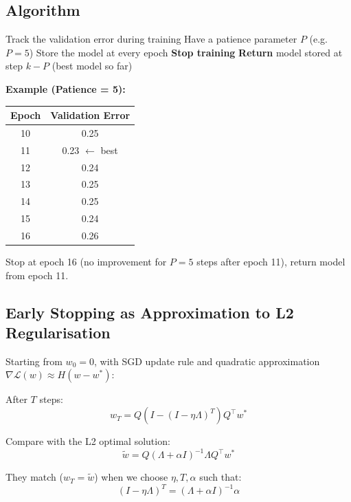 \documentclass[12pt,a4paper]{article}
\newcommand{\Loss}{\mathcal{L}}
\begin{document}
\subsection{Algorithm}

\begin{algorithm}
\caption{Early Stopping}
\begin{algorithmic}[1]
\State Track the validation error during training
\State Have a patience parameter $P$ (e.g.\ $P = 5$)
\State Store the model at every epoch
  \State \textbf{Stop training}
  \State \textbf{Return} model stored at step $k - P$ (best model so far)
\EndIf
\end{algorithmic}
\end{algorithm}

\textbf{Example (Patience = 5):}
\begin{center}
\begin{tabular}{cc}
\toprule
Epoch & Validation Error\\
\midrule
10 & 0.25\\
11 & 0.23 $\leftarrow$ best \\
12 & 0.24\\
13 & 0.25\\
14 & 0.25\\
15 & 0.24\\
16 & 0.26\\
\bottomrule
\end{tabular}
\end{center}

Stop at epoch 16 (no improvement for $P=5$ steps after epoch 11), return model from epoch 11.

\subsection{Early Stopping as Approximation to L2 Regularisation}

\begin{thmbox}[title={Early Stopping $\approx$ L2 Regularisation}]
Starting from $w_0 = 0$, with SGD update rule and quadratic approximation $\nabla\Loss(w) \approx H(w-w^*)$:

After $T$ steps:
\[
w_T = Q(I - (I-\eta\Lambda)^T)Q^\top w^*
\]

Compare with the L2 optimal solution:
\[
\tilde{w} = Q(\Lambda+\alpha I)^{-1}\Lambda Q^\top w^*
\]

They match ($w_T = \tilde{w}$) when we choose $\eta, T, \alpha$ such that:
\[
(I - \eta\Lambda)^T = (\Lambda + \alpha I)^{-1}\alpha
\]
\end{thmbox}
\end{document}
